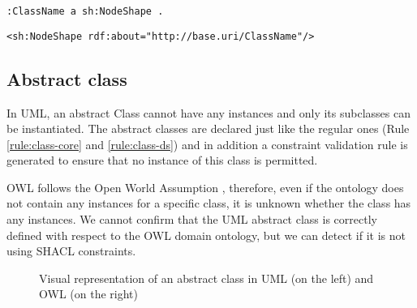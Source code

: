 \vspace{-\parskip}
\begin{minipage}[b]{.45\textwidth}
\begin{lstlisting}[language=Turtle, caption={Node shape declaration in Turtle syntax}, captionpos=b]
:ClassName a sh:NodeShape .
\end{lstlisting}
\end{minipage}%
\quad
\begin{minipage}[b]{.5\textwidth}
\begin{lstlisting}[language=RDF/XML, caption={Node shape declaration in RDF/XML syntax}, captionpos=b]
<sh:NodeShape rdf:about="http://base.uri/ClassName"/>
\end{lstlisting}
\end{minipage}

\subsection{Abstract class}
\label{sec:class-abstract}

In UML, an abstract Class \citep{uml2.5} cannot have any instances and only its subclasses
can be instantiated.
The abstract classes are declared just like the regular ones (Rule \ref{rule:class-core} and \ref{rule:class-ds}) and in addition a constraint validation rule is generated to ensure that no instance of this class is permitted. 

OWL follows the Open World Assumption \citep{owl2}, therefore, even if the ontology does not contain any instances for a specific class, it is unknown whether the class has any instances. We cannot confirm that the UML abstract class is correctly defined with respect to the OWL domain ontology, but we can detect if it is not using SHACL constraints.

\begin{figure}[!ht]
	\centering
	\begin{subfigure}{.5\textwidth}
		\centering
	\end{subfigure}%
	\begin{subfigure}{.5\textwidth}
		\centering
	\end{subfigure}
	\caption{Visual representation of an abstract class in UML (on the left) and OWL (on the right)}
	\label{fig:class-abstract-visual}
\end{figure}

